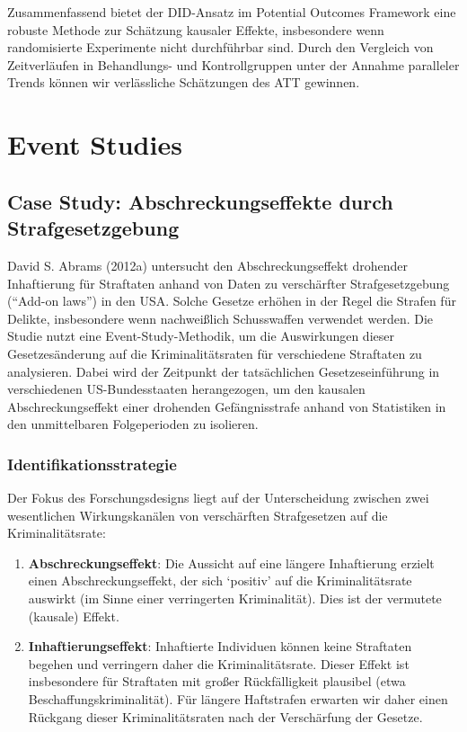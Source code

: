 \documentclass[
  a4paper,
  DIV=11,
  oneside]{scrreprt}
\begin{document}
Zusammenfassend bietet der DID-Ansatz im Potential Outcomes Framework
eine robuste Methode zur Schätzung kausaler Effekte, insbesondere wenn
randomisierte Experimente nicht durchführbar sind. Durch den Vergleich
von Zeitverläufen in Behandlungs- und Kontrollgruppen unter der Annahme
paralleler Trends können wir verlässliche Schätzungen des ATT gewinnen.


\chapter{Event Studies}\label{event-studies}

\section{Case Study: Abschreckungseffekte durch
Strafgesetzgebung}\label{case-study-abschreckungseffekte-durch-strafgesetzgebung}

David S. Abrams (2012a) untersucht den Abschreckungseffekt drohender
Inhaftierung für Straftaten anhand von Daten zu verschärfter
Strafgesetzgebung (``Add-on laws'') in den USA. Solche Gesetze erhöhen
in der Regel die Strafen für Delikte, insbesondere wenn nachweißlich
Schusswaffen verwendet werden. Die Studie nutzt eine
Event-Study-Methodik, um die Auswirkungen dieser Gesetzesänderung auf
die Kriminalitätsraten für verschiedene Straftaten zu analysieren. Dabei
wird der Zeitpunkt der tatsächlichen Gesetzeseinführung in verschiedenen
US-Bundesstaaten herangezogen, um den kausalen Abschreckungseffekt einer
drohenden Gefängnisstrafe anhand von Statistiken in den unmittelbaren
Folgeperioden zu isolieren.

\subsection{Identifikationsstrategie}\label{identifikationsstrategie-1}

Der Fokus des Forschungsdesigns liegt auf der Unterscheidung zwischen
zwei wesentlichen Wirkungskanälen von verschärften Strafgesetzen auf die
Kriminalitätsrate:

\begin{enumerate}
\def\labelenumi{\arabic{enumi}.}
\item
  \textbf{Abschreckungseffekt}: Die Aussicht auf eine längere
  Inhaftierung erzielt einen Abschreckungseffekt, der sich `positiv' auf
  die Kriminalitätsrate auswirkt (im Sinne einer verringerten
  Kriminalität). Dies ist der vermutete (kausale) Effekt.
\item
  \textbf{Inhaftierungseffekt}: Inhaftierte Individuen können keine
  Straftaten begehen und verringern daher die Kriminalitätsrate. Dieser
  Effekt ist insbesondere für Straftaten mit großer Rückfälligkeit
  plausibel (etwa Beschaffungskriminalität). Für längere Haftstrafen
  erwarten wir daher einen Rückgang dieser Kriminalitätsraten nach der
  Verschärfung der Gesetze.
\end{enumerate}
\end{document}
